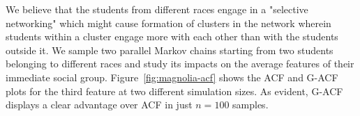 \documentclass[11pt]{article}
\theoremstyle{remark}
\begin{document}






We believe that the students from different races engage in a "selective networking" which might cause formation of clusters in the network wherein students within a cluster engage more with each other than with the students outside it. We sample two parallel Markov chains starting from two students belonging to different races and study its impacts on the average features of their immediate social group. Figure~\ref{fig:magnolia-acf} shows the ACF and G-ACF plots for the third feature at two different simulation sizes. As evident, G-ACF displays a clear advantage over ACF in just $n=100$ samples.



\singlespacing


\end{document}
